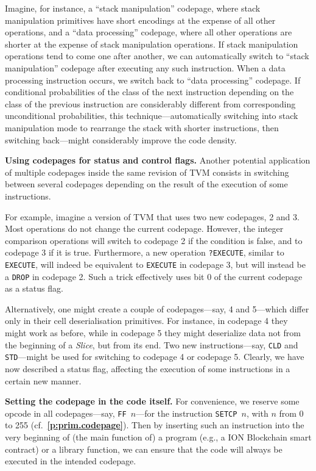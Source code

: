 \documentclass[12pt,oneside]{article}
\def\makepoint#1{\medbreak\noindent{\bf #1.\ }}
\def\nxsubpoint{\refstepcounter{subsubsection}%
  \smallbreak\makepoint{\thesubsubsection}}
\def\refpoint#1{{\rm\textbf{\ref{#1}}}}
\let\ptref=\refpoint
\def\emb#1{\textbf{#1.}}
\begin{document}
Imagine, for instance, a ``stack manipulation'' codepage, where stack manipulation primitives have short encodings at the expense of all other operations, and a ``data processing'' codepage, where all other operations are shorter at the expense of stack manipulation operations. If stack manipulation operations tend to come one after another, we can automatically switch to ``stack manipulation'' codepage after executing any such instruction. When a data processing instruction occurs, we switch back to ``data processing'' codepage. If conditional probabilities of the class of the next instruction depending on the class of the previous instruction are considerably different from corresponding unconditional probabilities, this technique---automatically switching into stack manipulation mode to rearrange the stack with shorter instructions, then switching back---might considerably improve the code density.

\nxsubpoint\emb{Using codepages for status and control flags}
Another potential application of multiple codepages inside the same revision of TVM consists in switching between several codepages depending on the result of the execution of some instructions.

For example, imagine a version of TVM that uses two new codepages, 2 and 3. Most operations do not change the current codepage. However, the integer comparison operations will switch to codepage 2 if the condition is false, and to codepage 3 if it is true. Furthermore, a new operation {\tt ?EXECUTE}, similar to {\tt EXECUTE}, will indeed be equivalent to {\tt EXECUTE} in codepage 3, but will instead be a {\tt DROP} in codepage 2. Such a trick effectively uses bit 0 of the current codepage as a status flag.

Alternatively, one might create a couple of codepages---say, 4 and 5---which differ only in their cell deserialisation primitives. For instance, in codepage 4 they might work as before, while in codepage 5 they might deserialize data not from the beginning of a {\em Slice}, but from its end. Two new instructions---say, {\tt CLD} and {\tt STD}---might be used for switching to codepage 4 or codepage 5. Clearly, we have now described a status flag, affecting the execution of some instructions in a certain new manner.

\nxsubpoint\emb{Setting the codepage in the code itself}\label{sp:setcp.opc}
For convenience, we reserve some opcode in all codepages---say, {\tt FF $n$}---for the instruction {\tt SETCP $n$}, with $n$ from 0 to 255 (cf.~\ptref{p:prim.codepage}). Then by inserting such an instruction into the very beginning of (the main function of) a program (e.g., a ION Blockchain smart contract) or a library function, we can ensure that the code will always be executed in the intended codepage.
\end{document}
